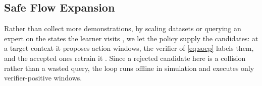 \documentclass[letterpaper, 10 pt, conference]{ieeeconf}
\newtheorem{proposition}{Proposition}
\begin{document}

\noindent 
\subsection{Safe Flow Expansion}
{\color{blue}
Rather than collect more demonstrations, by scaling datasets \cite{chi2023diffusion} or querying an expert on the states the learner visits \cite{ross2011reduction}, we let the policy supply the candidates: at a target context it proposes action windows, the verifier of \eqref{eq:socp} labels them, and the accepted ones retrain it \cite{de2026active}. Since a rejected candidate here is a collision rather than a wasted query, the loop runs offline in simulation and executes only verifier-positive windows.
}
\end{document}
